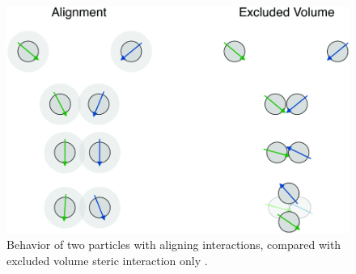 \documentclass[../../master_thesis_np.tex]{subfiles}
\begin{document}
		\begin{figure}[htp]
			\centering
			\includegraphics[width=\textwidth]{alignment.png}
			\caption{Behavior of two particles with aligning interactions, compared with excluded volume steric interaction only \cite{martin-gomez_collective_2018}.}
			\label{fig:alignment}
		\end{figure}
		
\end{document}
